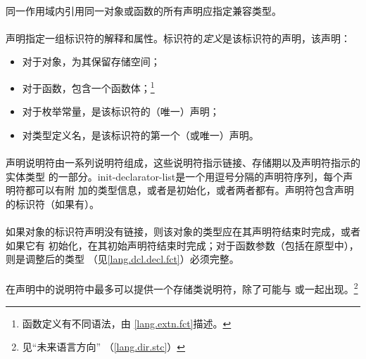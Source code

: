 \paragraph{}
同一作用域内引用同一对象或函数的所有声明应指定兼容类型。

\semantic
\paragraph{}
声明指定一组标识符的解释和属性。标识符的\textit{定义}是该标识符的声明，该声明：
\begin{itemize}
  \item{对于对象，为其保留存储空间；}
  \item{对于函数，包含一个函数体；\footnote{函数定义有不同语法，由
    \ref{lang.extn.fct}描述。}}
  \item{对于枚举常量，是该标识符的（唯一）声明；}
  \item{对类型定义名，是该标识符的第一个（或唯一）声明。}
\end{itemize}

\paragraph{}
声明说明符由一系列说明符组成，这些说明符指示链接、存储期以及声明符指示的实体类型
的一部分。init-declarator-list是一个用逗号分隔的声明符序列，每个声明符都可以有附
加的类型信息，或者是初始化，或者两者都有。声明符包含声明的标识符（如果有）。

\paragraph{}
如果对象的标识符声明没有链接，则该对象的类型应在其声明符结束时完成，或者如果它有
初始化，在其初始声明符结束时完成；对于函数参数（包括在原型中），则是调整后的类型
（见\ref{lang.dcl.decl.fct}）必须完整。


\syntax
\paragraph{}

\constraint
\paragraph{}
在声明中的说明符中最多可以提供一个存储类说明符，除了可能与
或一起出现。\footnote{见``未来语言方向''
（\ref{lang.dir.stc}）}

